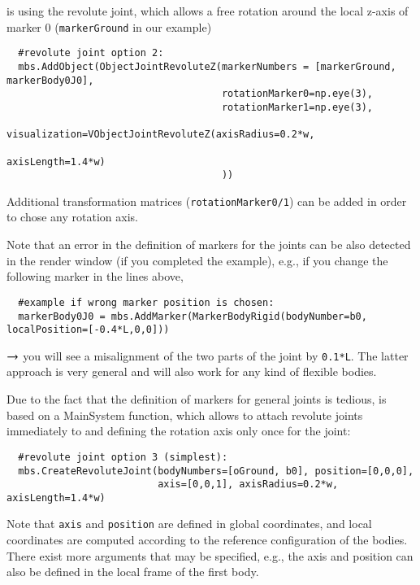 \noindent {} is using the revolute joint, which allows a free rotation around the local z-axis of marker 0 (\texttt{markerGround} in our example)
\pythonstyle\begin{lstlisting}
  #revolute joint option 2:
  mbs.AddObject(ObjectJointRevoluteZ(markerNumbers = [markerGround, markerBody0J0], 
                                     rotationMarker0=np.eye(3),
                                     rotationMarker1=np.eye(3),
                                     visualization=VObjectJointRevoluteZ(axisRadius=0.2*w, 
                                                                         axisLength=1.4*w)
                                     )) 
\end{lstlisting}
Additional transformation matrices (\texttt{rotationMarker0/1}) can be added in order to chose any rotation axis.

\noindent Note that an error in the definition of markers for the joints can be also detected in the render window (if you completed the example), e.g., if you change the following marker in the lines above,
\pythonstyle\begin{lstlisting}
  #example if wrong marker position is chosen:
  markerBody0J0 = mbs.AddMarker(MarkerBodyRigid(bodyNumber=b0, localPosition=[-0.4*L,0,0]))
\end{lstlisting}
$\rightarrow$ you will see a misalignment of the two parts of the joint by \texttt{0.1*L}.
The latter approach is very general and will also work for any kind of flexible bodies.

\noindent Due to the fact that the definition of markers for general joints is tedious,  is based on a MainSystem function, which allows to attach revolute joints immediately to  and defining the rotation axis only once for the joint:
\pythonstyle\begin{lstlisting}
  #revolute joint option 3 (simplest):
  mbs.CreateRevoluteJoint(bodyNumbers=[oGround, b0], position=[0,0,0], 
                          axis=[0,0,1], axisRadius=0.2*w, axisLength=1.4*w)
\end{lstlisting}
Note that \texttt{axis} and \texttt{position} are defined in global coordinates, and local coordinates are computed according to the reference configuration of the bodies.
There exist more arguments that may be specified, e.g., the axis and position can also be defined in the local frame of the first body.

